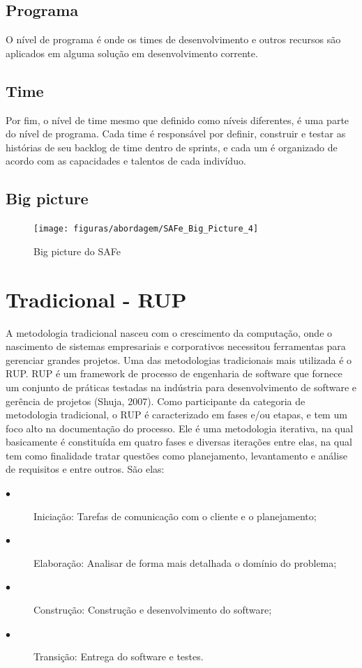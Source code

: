 \subsection{Programa}
O nível de programa é onde os times de desenvolvimento e outros recursos são aplicados em alguma solução em desenvolvimento corrente.

\subsection{Time}
Por fim, o nível de time mesmo que definido como níveis diferentes, é uma parte do nível de programa. Cada time é responsável por definir, construir e testar as histórias de seu backlog de time dentro de sprints, e cada um é organizado de acordo com as capacidades e talentos de cada indivíduo.

\subsection{Big picture}
\begin{figure}[!htpb]
	\centering
	\texttt{[image: figuras/abordagem/SAFe\_Big\_Picture\_4]}
	\caption{Big picture do SAFe}
\end{figure}

  \section{Tradicional - RUP}
A metodologia tradicional nasceu com o crescimento da computação, onde o nascimento de sistemas empresariais e corporativos necessitou ferramentas para gerenciar grandes projetos. Uma das metodologias tradicionais mais utilizada é o RUP.
RUP é um framework de processo de engenharia de software que fornece um conjunto de práticas testadas na indústria para desenvolvimento de software e gerência de projetos (Shuja, 2007). Como participante da categoria de metodologia tradicional, o RUP é caracterizado em fases e/ou etapas, e tem um foco alto na documentação do processo.
Ele é uma metodologia iterativa, na qual basicamente é constituída em quatro fases e diversas iterações entre elas, na qual tem como finalidade tratar questões como planejamento, levantamento e análise de requisitos e entre outros. São elas:
\begin{description}
\item[$\bullet$] Iniciação: Tarefas de comunicação com o cliente e o planejamento;
\item[$\bullet$] Elaboração: Analisar de forma mais detalhada o domínio do problema;
\item[$\bullet$] Construção: Construção e desenvolvimento do software;
\item[$\bullet$] Transição: Entrega do software e testes.
\end{description}
         
